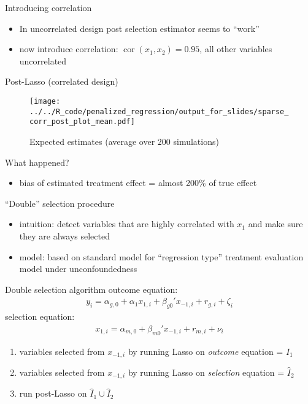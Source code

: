 \documentclass[xcolor=dvipsnames]{beamer}
\DeclareMathOperator{\cor}{cor}
\begin{document}
\begin{frame}{Introducing correlation}
    \begin{itemize}
      \item In uncorrelated design post selection estimator seems to ``work''
      \item now introduce correlation: $\cor(x_1, x_2) = 0.95$, all other variables uncorrelated
    \end{itemize}
\end{frame}

\begin{frame}{Post-Lasso (correlated design)}
\begin{figure}
  \texttt{[image: ../../R\_code/penalized\_regression/output\_for\_slides/sparse\_corr\_post\_plot\_mean.pdf]}
   \caption{Expected estimates (average over 200 simulations)}
\end{figure}
\end{frame}

\begin{frame}{What happened?}
\begin{itemize}
  \item bias of estimated treatment effect = almost 200\% of true effect
\end{itemize}
\end{frame}

\begin{frame}{``Double'' selection procedure \parencite{belloni2014inference}}
\begin{itemize}
  \item intuition: detect variables that are highly correlated with $x_1$ and make sure they are always selected
  \item model: based on standard model for ``regression type'' treatment evaluation model under unconfoundedness
\end{itemize}
\end{frame}

\begin{frame}{Double selection algorithm}
outcome equation:
\begin{align*}
  y_i = \alpha_{g, 0} + \alpha_1 x_{1,i} + \beta_{g0}' x_{-1, i} + r_{g, i} + \zeta_i
\end{align*}
selection equation: 
\begin{align*}
  x_{1, i} = \alpha_{m, 0} + \beta_{m0}' x_{-1, i} + r_{m, i} + \nu_i
\end{align*}
\begin{enumerate}[<+->]
  \item variables selected from $x_{-1, i}$ by running Lasso on \emph{outcome} equation = $\hat{I}_1$
  \item variables selected from $x_{-1, i}$ by running Lasso on \emph{selection} equation = $\hat{I}_2$
  \item run post-Lasso on $\hat{I}_1 \cup \hat{I}_2$
\end{enumerate}
\end{frame}
\end{document}
